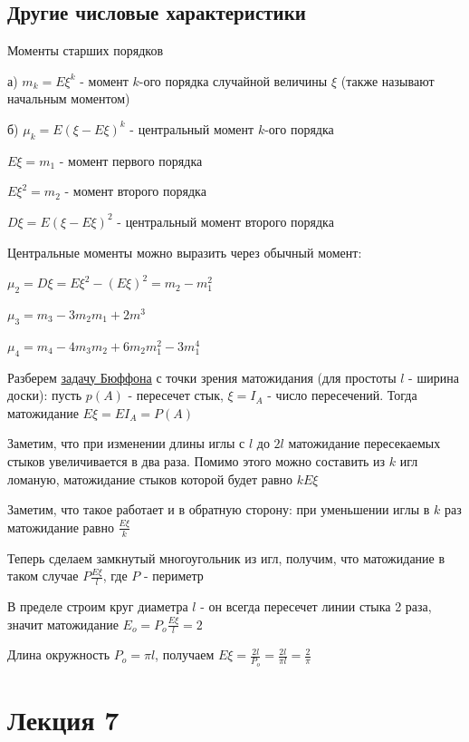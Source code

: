\documentclass[12pt]{article}
\begin{document}
    \subsection{Другие числовые характеристики}

    Моменты старших порядков

    а) $m_k = E\xi^k$ - момент $k$-ого порядка случайной величины $\xi$ (также называют начальным моментом)

    б) $\mu_k = E(\xi - E\xi)^k$ - центральный момент $k$-ого порядка

    $E\xi = m_1$ - момент первого порядка

    $E\xi^2 = m_2$ - момент второго порядка

    $D\xi = E(\xi - E\xi)^2$ - центральный момент второго порядка

    \Nota Центральные моменты можно выразить через обычный момент:

    $\mu_2 = D\xi = E\xi^2 - (E\xi)^2 = m_2 - m_1^2$

    $\mu_3 = m_3 - 3m_2 m_1 + 2m^3$

    $\mu_4 = m_4 - 4m_3 m_2 + 6m_2 m_1^2 - 3m_1^4$

    \Ex Разберем \hyperlink{buffonsproblem}{задачу Бюффона} с точки зрения матожидания (для простоты $l$ - ширина доски): пусть $p(A)$ - пересечет стык,
    $\xi = I_A$ - число пересечений. Тогда матожидание $E\xi = E I_A = P(A)$

    Заметим, что при изменении длины иглы с $l$ до $2l$ матожидание пересекаемых стыков увеличивается
    в два раза. Помимо этого можно составить из $k$ игл ломаную, матожидание стыков которой будет равно $kE\xi$

    Заметим, что такое работает и в обратную сторону: при уменьшении иглы в $k$ раз матожидание равно $\frac{E\xi}{k}$

    Теперь сделаем замкнутый многоугольник из игл, получим, что матожидание в таком случае $P\frac{E\xi}{l}$, где $P$ - периметр

    В пределе строим круг диаметра $l$ - он всегда пересечет линии стыка 2 раза, значит матожидание $E_o = P_o\frac{E\xi}{l} = 2$

    Длина окружность $P_o = \pi l$, получаем $E\xi = \frac{2l}{P_o} = \frac{2l}{\pi l} = \frac{2}{\pi}$


    \section{Лекция 7}
\end{document}
